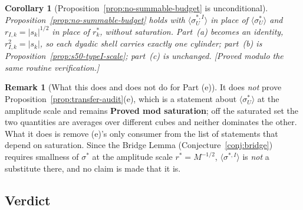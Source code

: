 \documentclass[11pt]{article}
\newtheorem{corollary}[theorem]{Corollary}
\theoremstyle{definition}
\newtheorem{remark}[theorem]{Remark}
\theoremstyle{remark}
\begin{document}
\begin{corollary}[Proposition~\ref{prop:no-summable-budget} is unconditional]
  \label{cor:s50-budget-unconditional}
  Proposition~\ref{prop:no-summable-budget} holds with
  $\langle\sigma^{*,I}_U\rangle$ in place of $\langle\sigma^*_U\rangle$ and
  $r_{I,k}=|s_k|^{1/2}$ in place of $r^*_k$, without saturation. Part~(a)
  becomes an identity, $r_{I,k}^2=|s_k|$, so each dyadic shell carries exactly
  one cylinder; part~(b) is Proposition~\ref{prop:s50-typeI-scale}; part~(c)
  is unchanged. \emph{[Proved modulo the same routine verification.]}
\end{corollary}

\begin{remark}[What this does and does not do for Part (e)]
  \label{rem:s50-not-e}
  It does \emph{not} prove Proposition~\ref{prop:transfer-audit}(e), which is
  a statement about $\langle\sigma^*_U\rangle$ at the amplitude scale and
  remains \textbf{Proved mod saturation}; off the saturated set the two
  quantities are averages over different cubes and neither dominates the
  other. What it does is remove (e)'s only consumer from the list of
  statements that depend on saturation. Since the Bridge Lemma
  (Conjecture~\ref{conj:bridge}) requires smallness of $\sigma^*$ at the
  amplitude scale $r^*=M^{-1/2}$, $\langle\sigma^{*,I}\rangle$ is
  \emph{not} a substitute there, and no claim is made that it is.
\end{remark}

\subsection{Verdict}
\label{subsec:s50-verdict}
\end{document}
